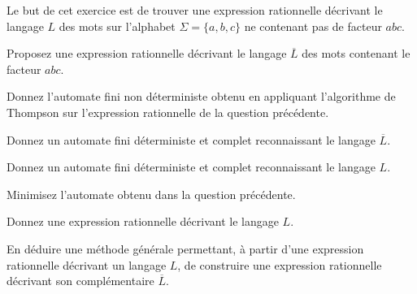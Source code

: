 
\begingroup

\begin{exercice} \label{exo:lexing/minimisation/inverse}

  Le but de cet exercice est de trouver une expression rationnelle décrivant le langage $L$ des mots sur l'alphabet $\Sigma=\{a,b,c\}$ ne contenant pas de facteur $abc$. 
  \begin{questions}
  \item Proposez une expression rationnelle décrivant le langage $\overline{L}$ des mots contenant le facteur $abc$.
  \item Donnez l'automate fini non déterministe obtenu en appliquant l'algorithme de Thompson sur l'expression rationnelle de la question précédente.
  \item Donnez un automate fini déterministe et complet reconnaissant le langage $\overline{L}$.
  \item Donnez un automate fini déterministe et complet reconnaissant le langage $L$.
  \item Minimisez l'automate obtenu dans la question précédente.
  \item Donnez une expression rationnelle décrivant le langage $L$.
  \item En déduire une méthode générale permettant, à partir d'une expression rationnelle décrivant un langage $L$,
      de construire une expression rationnelle décrivant son complémentaire $\overline{L}$.
  \end{questions}

\end{exercice}

